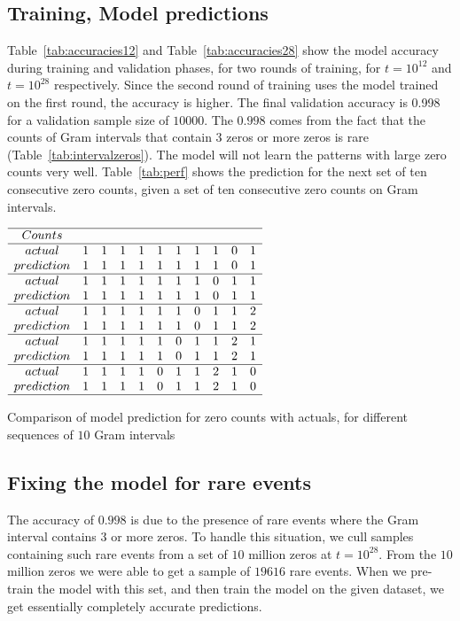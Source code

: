 \documentclass[twoside]{article}
\begin{document}
\subsection{\label{relation}Training,  Model predictions}

Table~\ref{tab:accuracies12} and Table~\ref{tab:accuracies28} show the model accuracy during training and validation phases, for two rounds of training, for $t=10^{12}$ and $t=10^{28}$ respectively. Since the second round of training uses the model trained on the first round, the accuracy is higher. The final validation accuracy is 0.998 for a validation sample size of $10000$. The $0.998$ comes from the fact that the counts of Gram intervals that contain $3$ zeros or more zeros is rare (Table~\ref{tab:intervalzeros}). The model will not learn the patterns with large zero counts very well. 
Table~\ref{tab:perf} shows the prediction for the next set of ten consecutive zero counts, given a set of ten consecutive zero counts on Gram intervals.  

\begin{table}
\centering \(\begin{array}{ccccccccccc}
\hline
Counts& \\
\hline
actual     &1&1&1&1&1&1&1&1&0&1\\
prediction &1&1&1&1&1&1&1&1&0&1\\
\hline
actual     &1&1&1&1&1&1&1&0&1&1\\
prediction &1&1&1&1&1&1&1&0&1&1\\
\hline
actual     &1&1&1&1&1&1&0&1&1&2\\
prediction &1&1&1&1&1&1&0&1&1&2\\
\hline
actual     &1&1&1&1&1&0&1&1&2&1\\
prediction &1&1&1&1&1&0&1&1&2&1\\
\hline
actual     &1&1&1&1&0&1&1&2&1&0\\
prediction &1&1&1&1&0&1&1&2&1&0\\
\hline
\end{array}\)
\caption{Comparison of model prediction for zero counts with actuals, for different sequences of $10$ Gram intervals} 
\label{tab:perf}
\end{table}

\subsection{\label{rarefix}Fixing the model for rare events}
The accuracy of $0.998$ is due to the presence of rare events where the Gram interval contains $3$ or more zeros. To handle this situation, we cull samples containing such rare events from a set of $10$ million zeros at $t=10^{28}$. From the $10$ million zeros we were able to get a sample of $19616$ rare events. When we pre-train the model with this set, and then train the model on the given dataset, we get essentially completely accurate predictions.
\end{document}
